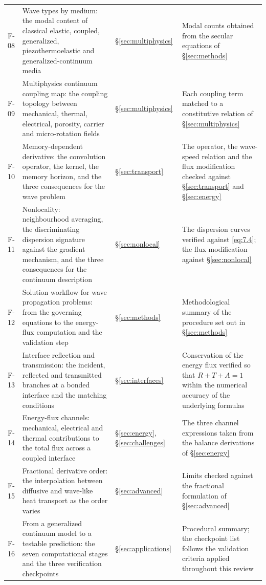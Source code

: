 \begin{table}[h]
\begin{tabularx}{\textwidth}{@{}lXlX@{}}
F-08 & Wave types by medium: the modal content of classical elastic, coupled, generalized, piezothermoelastic and generalized-continuum media & \S\ref{sec:multiphysics} & Modal counts obtained from the secular equations of \S\ref{sec:methods} \\
F-09 & Multiphysics continuum coupling map: the coupling topology between mechanical, thermal, electrical, porosity, carrier and micro-rotation fields & \S\ref{sec:multiphysics} & Each coupling term matched to a constitutive relation of \S\ref{sec:multiphysics} \\
F-10 & Memory-dependent derivative: the convolution operator, the kernel, the memory horizon, and the three consequences for the wave problem & \S\ref{sec:transport} & The operator, the wave-speed relation and the flux modification checked against \S\ref{sec:transport} and \S\ref{sec:energy} \\
F-11 & Nonlocality: neighbourhood averaging, the discriminating dispersion signature against the gradient mechanism, and the three consequences for the continuum description & \S\ref{sec:nonlocal} & The dispersion curves verified against \eqref{eq:7.4}; the flux modification against \S\ref{sec:nonlocal} \\
F-12 & Solution workflow for wave propagation problems: from the governing equations to the energy-flux computation and the validation step & \S\ref{sec:methods} & Methodological summary of the procedure set out in \S\ref{sec:methods} \\
F-13 & Interface reflection and transmission: the incident, reflected and transmitted branches at a bonded interface and the matching conditions & \S\ref{sec:interfaces} & Conservation of the energy flux verified so that $R + T + A = 1$ within the numerical accuracy of the underlying formulas \\
F-14 & Energy-flux channels: mechanical, electrical and thermal contributions to the total flux across a coupled interface & \S\ref{sec:energy}, \S\ref{sec:challenges} & The three channel expressions taken from the balance derivations of \S\ref{sec:energy} \\
F-15 & Fractional derivative order: the interpolation between diffusive and wave-like heat transport as the order varies & \S\ref{sec:advanced} & Limits checked against the fractional formulation of \S\ref{sec:advanced} \\
F-16 & From a generalized continuum model to a testable prediction: the seven computational stages and the three verification checkpoints & \S\ref{sec:applications} & Procedural summary; the checkpoint list follows the validation criteria applied throughout this review \\

\end{tabularx}
\end{table}
